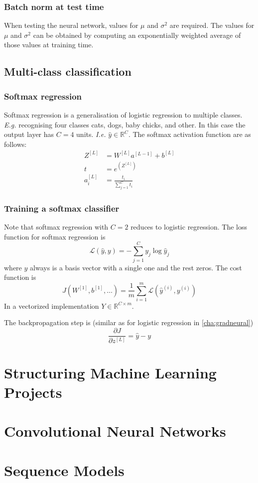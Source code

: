 \documentclass{article}
\begin{document}
\subsubsection{Batch norm at test time}
When testing the neural network, values for $\mu$ and $\sigma^2$ are required.
The values for $\mu$ and $\sigma^2$ can be obtained by computing an exponentially weighted average
of those values at training time.

\subsection{Multi-class classification}
\subsubsection{Softmax regression}
Softmax regression is a generalisation of logistic regression to multiple classes.
\emph{E.g.} recognising four classes cats, dogs, baby chicks, and other.
In this case the output layer has $C=4$ units.
\emph{I.e.} $\hat{y}\in\mathbb{R}^C$.
The softmax activation function are as follows:
\begin{equation}
  \begin{split}
    Z^{[L]}&=W^{[L]}a^{[L-1]}+b^{[L]}\\
    t&=e^{(Z^{[L]})}\\
    a_i^{[L]}&=\frac{t_i}{\sum_{j=1}^C t_i}
  \end{split}
\end{equation}

\subsubsection{Training a softmax classifier}
Note that softmax regression with $C=2$ reduces to logistic regression.
The loss function for softmax regression is
\begin{equation}
  \mathcal{L}(\hat{y},y)=-\sum_{j=1}^C y_j\log\hat{y}_j
\end{equation}
where $y$ always is a basis vector with a single one and the rest zeros.
The cost function is
\begin{equation}
  J(W^{[1]},b^{[1]},\ldots)=\frac{1}{m}\sum_{i=1}^m\mathcal{L}(\hat{y}^{(i)},y^{(i)})
\end{equation}
In a vectorized implementation $Y\in\mathbb{R}^{C\times m}$.

The backpropagation step is (similar as for logistic regression in \cref{cha:gradneural})
\begin{equation}
  \frac{\partial J}{\partial z^{[L]}}=\hat{y}-y
\end{equation}

\section{Structuring Machine Learning Projects}
\section{Convolutional Neural Networks}
\section{Sequence Models}
\end{document}
